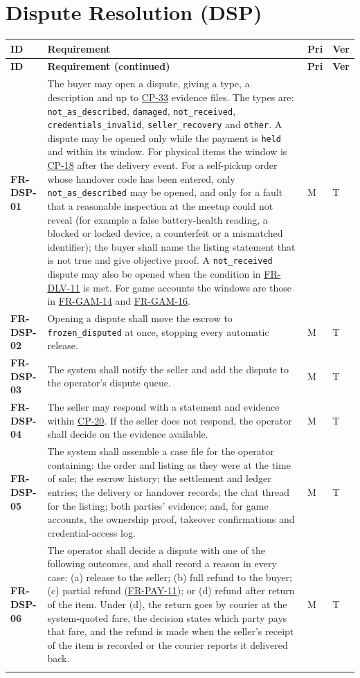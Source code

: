 \documentclass[11pt,a4paper]{report}
\makeatletter
\newenvironment{reqs}{%
  \small
  \begin{longtable}{@{}>{\raggedright\arraybackslash}p{2.35cm}
                       >{\raggedright\arraybackslash}p{10.3cm}
                       >{\centering\arraybackslash}p{0.7cm}
                       >{\centering\arraybackslash}p{0.7cm}@{}}
  \toprule
  \textbf{ID} & \textbf{Requirement} & \textbf{Pri} & \textbf{Ver} \\
  \midrule
  \endfirsthead
  \toprule
  \textbf{ID} & \textbf{Requirement (continued)} & \textbf{Pri} & \textbf{Ver} \\
  \midrule
  \endhead
  \bottomrule
  \endfoot
}{\end{longtable}}
\newcommand{\req}[5]{\leavevmode\textbf{#1}\hypertarget{#1}{} & #5 & #2 & #3 \\ \addlinespace[2pt]}
\newcommand{\rr}[1]{\hyperlink{#1}{#1}}
\newcommand{\cp}[1]{\hyperlink{#1}{#1}}
\makeatother
\begin{document}
\section{Dispute Resolution (DSP)}
\label{sec:fr-dsp}
\begin{reqs}
\req{FR-DSP-01}{M}{T}{FR-69}{The buyer may open a dispute, giving a type, a description and up to \cp{CP-33} evidence files. The types are: \texttt{not\_as\_described}, \texttt{damaged}, \texttt{not\_received}, \texttt{credentials\_invalid}, \texttt{seller\_recovery} and \texttt{other}. A dispute may be opened only while the payment is \texttt{held} and within its window. For physical items the window is \cp{CP-18} after the delivery event. For a self-pickup order whose handover code has been entered, only \texttt{not\_as\_described} may be opened, and only for a fault that a reasonable inspection at the meetup could not reveal (for example a false battery-health reading, a blocked or locked device, a counterfeit or a mismatched identifier); the buyer shall name the listing statement that is not true and give objective proof. A \texttt{not\_received} dispute may also be opened when the condition in \rr{FR-DLV-11} is met. For game accounts the windows are those in \rr{FR-GAM-14} and \rr{FR-GAM-16}.}
\req{FR-DSP-02}{M}{T}{FR-70}{Opening a dispute shall move the escrow to \texttt{frozen\_disputed} at once, stopping every automatic release.}
\req{FR-DSP-03}{M}{T}{FR-71}{The system shall notify the seller and add the dispute to the operator's dispute queue.}
\req{FR-DSP-04}{M}{T}{new}{The seller may respond with a statement and evidence within \cp{CP-20}. If the seller does not respond, the operator shall decide on the evidence available.}
\req{FR-DSP-05}{M}{T}{new}{The system shall assemble a case file for the operator containing: the order and listing as they were at the time of sale; the escrow history; the settlement and ledger entries; the delivery or handover records; the chat thread for the listing; both parties' evidence; and, for game accounts, the ownership proof, takeover confirmations and credential-access log.}
\req{FR-DSP-06}{M}{T}{FR-72}{The operator shall decide a dispute with one of the following outcomes, and shall record a reason in every case: (a) release to the seller; (b) full refund to the buyer; (c) partial refund (\rr{FR-PAY-11}); or (d) refund after return of the item. Under (d), the return goes by courier at the system-quoted fare, the decision states which party pays that fare, and the refund is made when the seller's receipt of the item is recorded or the courier reports it delivered back.}

\end{reqs}
\end{document}
